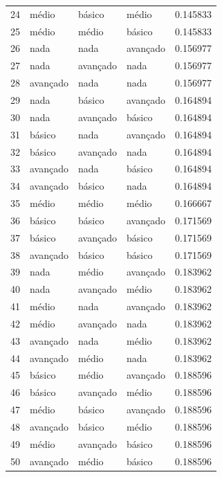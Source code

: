 \documentclass[]{article}
\begin{document}
\begin{longtable}{|llll|r|}
		24 & médio    & básico   & médio    & 0.145833     \\
		25 & médio    & médio    & básico   & 0.145833     \\
		26 & nada      & nada      & avançado & 0.156977     \\
		27 & nada      & avançado & nada      & 0.156977     \\
		28 & avançado & nada      & nada      & 0.156977     \\
		29 & nada      & básico   & avançado & 0.164894     \\
		30 & nada      & avançado & básico   & 0.164894     \\
		31 & básico   & nada      & avançado & 0.164894     \\
		32 & básico   & avançado & nada      & 0.164894     \\
		33 & avançado & nada      & básico   & 0.164894     \\
		34 & avançado & básico   & nada      & 0.164894     \\
		35 & médio    & médio    & médio    & 0.166667     \\
		36 & básico   & básico   & avançado & 0.171569     \\
		37 & básico   & avançado & básico   & 0.171569     \\
		38 & avançado & básico   & básico   & 0.171569     \\
		39 & nada      & médio    & avançado & 0.183962     \\
		40 & nada      & avançado & médio    & 0.183962     \\
		41 & médio    & nada      & avançado & 0.183962     \\
		42 & médio    & avançado & nada      & 0.183962     \\
		43 & avançado & nada      & médio    & 0.183962     \\
		44 & avançado & médio    & nada      & 0.183962     \\
		45 & básico   & médio    & avançado & 0.188596     \\
		46 & básico   & avançado & médio    & 0.188596     \\
		47 & médio    & básico   & avançado & 0.188596     \\
		48 & avançado & básico   & médio    & 0.188596     \\
		49 & médio    & avançado & básico   & 0.188596     \\
		50 & avançado & médio    & básico   & 0.188596     \\

\end{longtable}
\end{document}
